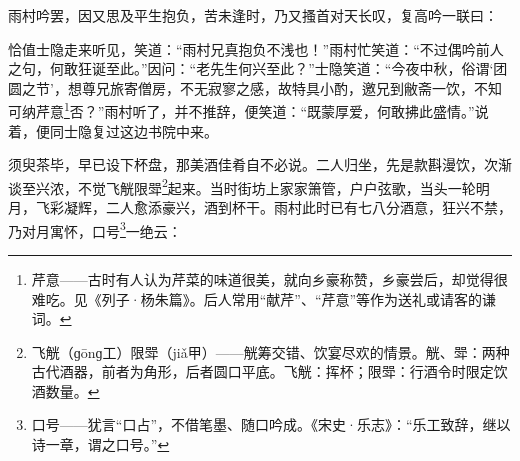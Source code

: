 \par 雨村吟罢，因又思及平生抱负，苦未逢时，乃又搔首对天长叹，复高吟一联曰：
\par 恰值士隐走来听见，笑道：“雨村兄真抱负不浅也！”雨村忙笑道：“不过偶吟前人之句，何敢狂诞至此。”因问：“老先生何兴至此？”士隐笑道：“今夜中秋，俗谓‘团圆之节’，想尊兄旅寄僧房，不无寂寥之感，故特具小酌，邀兄到敝斋一饮，不知可纳芹意\footnote{芹意——古时有人认为芹菜的味道很美，就向乡豪称赞，乡豪尝后，却觉得很难吃。见《列子·杨朱篇》。后人常用“献芹”、“芹意”等作为送礼或请客的谦词。}否？”雨村听了，并不推辞，便笑道：“既蒙厚爱，何敢拂此盛情。”说着，便同士隐复过这边书院中来。
\par 须臾茶毕，早已设下杯盘，那美酒佳肴自不必说。二人归坐，先是款斟漫饮，次渐谈至兴浓，不觉飞觥限斝\footnote{飞觥（ɡōnɡ工）限斝（jiǎ甲）——觥筹交错、饮宴尽欢的情景。觥、斝：两种古代酒器，前者为角形，后者圆口平底。飞觥：挥杯；限斝：行酒令时限定饮酒数量。}起来。当时街坊上家家箫管，户户弦歌，当头一轮明月，飞彩凝辉，二人愈添豪兴，酒到杯干。雨村此时已有七八分酒意，狂兴不禁，乃对月寓怀，口号\footnote{口号——犹言“口占”，不借笔墨、随口吟成。《宋史·乐志》：“乐工致辞，继以诗一章，谓之口号。”}一绝云：
